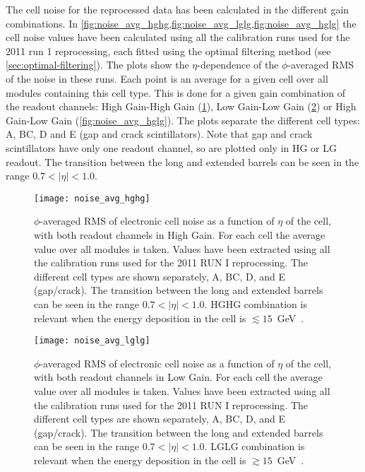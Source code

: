 The cell noise for the reprocessed data has been calculated in the different
gain combinations. In
\cref{fig:noise_avg_hghg,fig:noise_avg_lglg,fig:noise_avg_hglg} the cell noise
values have been calculated using all the calibration runs used for the 2011 run
1 reprocessing, each fitted using the optimal filtering method (see
\cref{sec:optimal-filtering}). The plots show the $\eta$-dependence of the
$\phi$-averaged RMS of the noise in these runs. Each point is an average for a
given cell over all modules containing this cell type. This is done for a given
gain combination of the readout channels: High Gain-High Gain
(\cref{fig:noise_avg_hghg}), Low Gain-Low Gain (\cref{fig:noise_avg_lglg}) or
High Gain-Low Gain (\cref{fig:noise_avg_hglg}). The plots separate the different
cell types: A, BC, D and E (gap and crack scintillators). Note that gap and
crack scintillators have only one readout channel, so are plotted only in HG or
LG readout. The transition between the long and extended barrels can be seen in
the range $0.7 < |\eta| < 1.0$.
\begin{figure}[!htb]
  \centering
    \texttt{[image: noise\_avg\_hghg]}
    \caption{$\phi$-averaged RMS of electronic cell noise as a function of
      $\eta$ of the cell, with both readout channels in High Gain. For each cell
      the average value over all modules is taken. Values have been extracted
      using all the calibration runs used for the 2011 RUN I reprocessing. The
      different cell types are shown separately, A, BC, D, and E
      (gap/crack). The transition between the long and extended barrels can be
      seen in the range $0.7 < |\eta| < 1.0$. HGHG combination is relevant when
      the energy deposition in the cell is
      $\lesssim 15$~GeV~\cite{MyTileCalPlots}.}
    \label{fig:noise_avg_hghg}
\end{figure}
\begin{figure}[!htb]
  \centering
    \texttt{[image: noise\_avg\_lglg]}
    \caption{$\phi$-averaged RMS of electronic cell noise as a function of
      $\eta$ of the cell, with both readout channels in Low Gain. For each cell
      the average value over all modules is taken. Values have been extracted
      using all the calibration runs used for the 2011 RUN I reprocessing. The
      different cell types are shown separately, A, BC, D, and E
      (gap/crack). The transition between the long and extended barrels can be
      seen in the range $0.7 < |\eta| < 1.0$. LGLG combination is relevant when
      the energy deposition in the cell is
      $\gtrsim 15$~GeV~\cite{MyTileCalPlots}.}
    \label{fig:noise_avg_lglg}
\end{figure}
